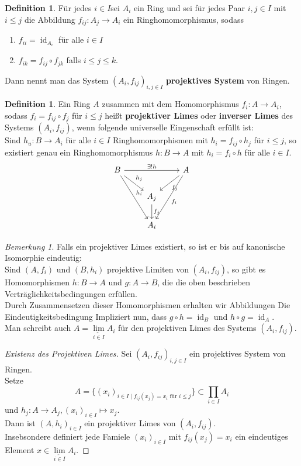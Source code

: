 \documentclass[10pt,a4paper]{article}
\newcommand{\id}{\operatorname{id}}
\renewcommand{\projlim}[1]{\lim\limits_{\overleftarrow{#1}}}
\theoremstyle{plain}
\theoremstyle{definition}
\newtheorem{definition}[theorem]{Definition}
\theoremstyle{remark}
\newtheorem{bem}[theorem]{Bemerkung}
\begin{document}
	\begin{definition}
		Für jedes $i\in I $sei $A_i$ ein Ring und sei für jedes Paar $i,j\in I$ mit $i\leq j$ die Abbildung $f_{ij}:A_j\to A_i$ ein Ringhomomorphismus, sodass
		\begin{enumerate}
			\item $f_{ii}=\id_{A_i}$ für alle $i\in I$
			\item $f_{ik}=f_{ij}\circ f_{jk}$ falls $i\leq j\leq k$.
		\end{enumerate}
		Dann nennt man das System $(A_i,f_{ij})_{i,j\in I}$ \textbf{projektives System} von Ringen.
	\end{definition}

	\begin{definition}
		Ein Ring $A$ zusammen mit dem Homomorphismus $f_i:A\to A_i$, sodass $f_i=f_{ij}\circ f_{j}$ für $i\leq j$ heißt \textbf{projektiver Limes} oder \textbf{inverser Limes} des Systems $(A_i,f_{ij})$, wenn folgende universelle Eingenschaft erfüllt ist:\\
		Sind $h_u:B\to A_i$ für alle $i\in I$ Ringhomomorphismen mit $h_i=f_{ij}\circ h_j$ für $i\leq j$, so existiert genau ein Ringhomomorphismus $h:B\to A$ mit $h_i=f_i\circ h$ für alle $i\in I$.
		\[\begin{tikzcd}
		B \ar[rr,"\exists!h"] \ar[rdd,"h_i"] \ar[rd,"h_j"] && A \ar[ld,"f_j"] \ar[ldd,"f_i"]\\
		& A_j \ar[d,"f_j"]&\\
		& A_i &
		\end{tikzcd}\]
	\end{definition}

	\begin{bem}
		Falls ein projektiver Limes existiert, so ist er bis auf kanonische Isomorphie eindeutig:\\
		Sind $(A,f_i)$ und $(B,h_i)$ projektive Limiten von $(A_i,f_{ij})$, so gibt es Homomorphismen $h:B\to A$ und $g:A\to B$, die die oben beschrieben Verträglichkeitsbedingungen erfüllen.\\
		Durch Zusammensetzen dieser Homomorphismen erhalten wir Abbildungen
		Die Eindeutigkeitsbedingung Impliziert nun, dass $g\circ h=\id_B$ und $h\circ g=\id_A$.\\
		Man schreibt auch $A=\projlim{i\in I}A_i$ für den projektiven Limes des Systems $(A_i,f_{ij})$.
	\end{bem}

	\begin{proof}[Existenz des Projektiven Limes]
		Sei $(A_i,f_{ij})_{i,j\in I}$ ein projektives System von Ringen.\\
		Setze 
		\[A=\{(x_i)_{i\in I\mid \text{$f_{ij}(x_j)=x_i$ für $i\leq j$}}\}\subset\prod_{i\in I}A_i\]
		und $h_j:A\to A_j,(x_i)_{i\in I}\mapsto x_j$.\\
		Dann ist $(A,h_i)_{i\in I}$ ein projektiver Limes von $(A_i,f_{ij})$.\\
		Insebsondere definiert jede Famiele $(x_i)_{i\in I}$ mit $f_{ij}(x_j)=x_i$ ein eindeutiges Element $x\in\projlim{i\in I}A_i$.
	\end{proof}
\end{document}
